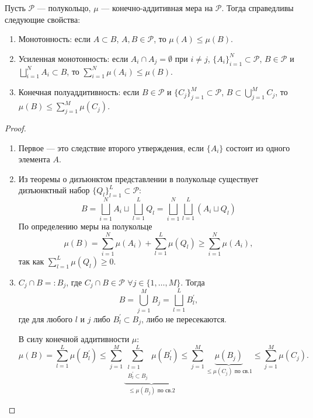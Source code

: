 \begin{lemma}
    Пусть $\mathcal{P}$ — полукольцо, $\mu$ — конечно-аддитивная мера на $\mathcal{P}$. Тогда справедливы следующие свойства:
    \begin{enumerate}
        \item Монотонность: если $A \subset B$, $A, B \in \mathcal{P}$, то $\mu(A) \leqslant \mu(B)$.
        \item Усиленная монотонность: если $A_i \cap A_j = \emptyset$ при $i \neq j$, $\{A_i\}_{i=1}^N \subset \mathcal{P}$, $B \in \mathcal{P}$ и $\bigsqcup\limits_{i=1}^N A_i \subset B$, то $\sum\limits_{i=1}^N \mu(A_i) \leqslant \mu(B)$.
        \item Конечная полуаддитивность: если $B \in \mathcal{P}$ и $\{C_j\}_{j=1}^M \subset \mathcal{P}$, $B \subset \bigcup\limits_{j=1}^M C_j$, то $\mu(B) \leqslant \sum\limits_{j=1}^M \mu(C_j).$
    \end{enumerate}
\end{lemma}
\begin{proof}\tab
    \begin{enumerate}
        \item Первое — это следствие второго утверждения, если $\{A_i\}$ состоит из одного элемента $A$.
        \item Из теоремы о дизъюнктом представлении в полукольце существует дизъюнктный набор $\{Q_l\}_{l=1}^L \subset \mathcal{P}$:
        \[B = \bigsqcup_{i=1}^N A_i \sqcup \bigsqcup_{l=1}^L Q_l = \bigsqcup_{i=1}^N \bigsqcup_{l=1}^L (A_i \sqcup Q_l)\]
        По определению меры на полукольце
        \[\mu(B) = \sum\limits_{i=1}^{N} \mu(A_i) + \sum\limits_{l=1}^{L} \mu(Q_l) \geqslant \sum\limits_{i=1}^{N} \mu(A_i),\]
        так как $\sum\limits_{l=1}^{L}\mu(Q_l) \geqslant 0$.
        \item $C_j \cap B =: B_j$, где $C_j \cap B \in \mathcal{P}$ $\forall j \in \{1, \dots, M\}$. Тогда
        \[B = \bigcup\limits_{j=1}^{M} B_j = \bigsqcup\limits_{l=1}^{L}B_l^{'},\]
        где для любого $l$ и $j$ либо $B_l^{'} \subset B_j$, либо не пересекаются.
        
        В силу конечной аддитивности $\mu$:
        \[\mu(B) = \sum\limits_{l=1}^{L}\mu(B_l^{'}) \leqslant \sum\limits_{j=1}^{M} \underbrace{\sum\limits_{\substack{l=1 \\ B_l^{'} \subset B_j}}^{L} \mu(B_l^{'})}_{\leqslant \mu(B_j) \text{ по св.2}} \leqslant \sum\limits_{j=1}^{M}\underbrace{\mu(B_j)}_{\leqslant \mu(C_j) \text{ по св.1}} \leqslant \sum\limits_{j=1}^{M} \mu(C_j).\]
    \end{enumerate}
\end{proof} 

